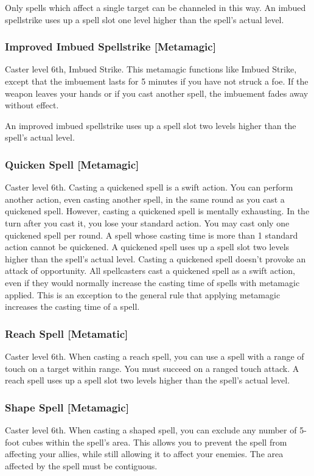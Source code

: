 Only spells which affect a single target can be channeled in this way. An imbued spellstrike uses up a spell slot one level higher than the spell's actual level.

\subsubsection{Improved Imbued Spellstrike [Metamagic]}
 Caster level 6th, Imbued Strike.
 This metamagic functions like Imbued Strike, except that the imbuement lasts for 5 minutes if you have not struck a foe. If the weapon leaves your hands or if you cast another spell, the imbuement fades away without effect.

An improved imbued spellstrike uses up a spell slot two levels higher than the spell's actual level.

\subsubsection{Quicken Spell [Metamagic]}
 Caster level 6th.
 Casting a quickened spell is a swift action. You can perform another action, even casting another spell, in the same round as you cast a quickened spell. However, casting a quickened spell is mentally exhausting. In the turn after you cast it, you lose your standard action. You may cast only one quickened spell per round. A spell whose casting time is more than 1 standard action cannot be quickened. A quickened spell uses up a spell slot two levels higher than the spell's actual level. Casting a quickened spell doesn't provoke an attack of opportunity.
 All spellcasters cast a quickened spell as a swift action, even if they would normally increase the casting time of spells with metamagic applied. This is an exception to the general rule that applying metamagic increases the casting time of a spell.

\subsubsection{Reach Spell [Metamatic]}
 Caster level 6th.
 When casting a reach spell, you can use a spell with a range of touch on a target within \rngclose range. You must succeed on a ranged touch attack. A reach spell uses up a spell slot two levels higher than the spell's actual level.

\subsubsection{Shape Spell [Metamagic]}
 Caster level 6th.
 When casting a shaped spell, you can exclude any number of 5-foot cubes within the spell's area. This allows you to prevent the spell from affecting your allies, while still allowing it to affect your enemies. The area affected by the spell must be contiguous.

